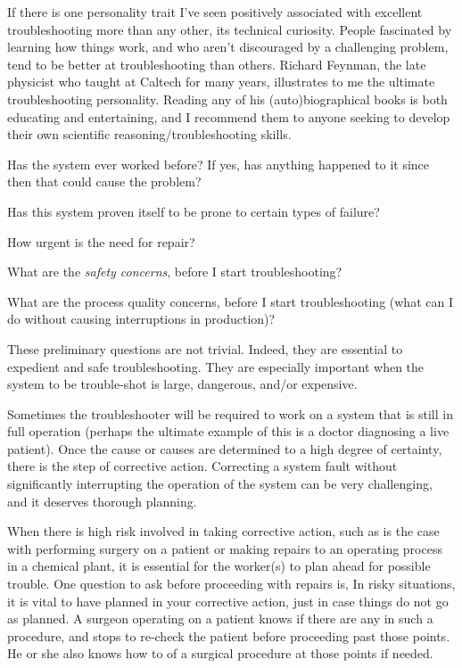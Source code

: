 If there is one personality trait I've seen positively associated with
excellent troubleshooting more than any other, its technical curiosity.
People fascinated by learning how things work, and who aren't
discouraged by a challenging problem, tend to be better at
troubleshooting than others. Richard Feynman, the late physicist who
taught at Caltech for many years, illustrates to me the ultimate
troubleshooting personality. Reading any of his (auto)biographical books
is both educating and entertaining, and I recommend them to anyone
seeking to develop their own scientific reasoning/troubleshooting
skills.

\stopsection

\startsection[title={Questions to Ask Before
Proceeding},reference={sec:xtocid15790971}]

\startitemize[packed]
\item
  Has the system ever worked before? If yes, has anything happened to it
  since then that could cause the problem?
\item
  Has this system proven itself to be prone to certain types of failure?
\item
  How urgent is the need for repair?
\item
  What are the {\em safety concerns}, before I start troubleshooting?
\item
  What are the process quality concerns, before I start troubleshooting
  (what can I do without causing interruptions in production)?
\stopitemize

These preliminary questions are not trivial. Indeed, they are essential
to expedient and safe troubleshooting. They are especially important
when the system to be trouble-shot is large, dangerous, and/or
expensive.

Sometimes the troubleshooter will be required to work on a system that
is still in full operation (perhaps the ultimate example of this is a
doctor diagnosing a live patient). Once the cause or causes are
determined to a high degree of certainty, there is the step of
corrective action. Correcting a system fault without significantly
interrupting the operation of the system can be very challenging, and it
deserves thorough planning.

When there is high risk involved in taking corrective action, such as is
the case with performing surgery on a patient or making repairs to an
operating process in a chemical plant, it is essential for the worker(s)
to plan ahead for possible trouble. One question to ask before
proceeding with repairs is,  In risky situations, it is
vital to have planned  in your corrective
action, just in case things do not go as planned. A surgeon operating on
a patient knows if there are any  in such
a procedure, and stops to re-check the patient before proceeding past
those points. He or she also knows how to  of a
surgical procedure at those points if needed.

